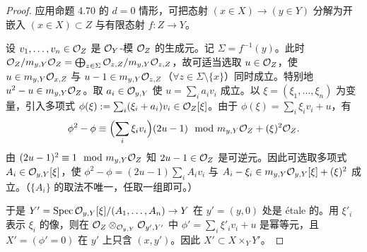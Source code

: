 \begin{proof}
应用命题 4.70 的 $d=0$ 情形，可把态射 $(x\in X)\to(y\in Y)$ 分解为开嵌入 $(x\in X)\subset Z$ 与有限态射 $f:Z\to Y$。

设 $v_1,\dots,v_n\in\mathcal{O}_Z$ 是 $\mathcal{O}_Y$-模 $\mathcal{O}_Z$ 的生成元。记 $\Sigma=f^{-1}(y)$。此时 $\mathcal{O}_Z/m_{y,Y}\mathcal{O}_Z=\bigoplus_{z\in\Sigma}\mathcal{O}_{z,Z}/m_{y,Y}\mathcal{O}_{z,Z}$，故可适当选取 $u\in\mathcal{O}_Z$，使 $u\in m_{y,Y}\mathcal{O}_{x,Z}$ 与 $u-1\in m_{y,Y}\mathcal{O}_{z,Z}$（$\forall z\in\Sigma\setminus\{x\}$）同时成立。特别地 $u^2-u\in m_{y,Y}\mathcal{O}_Z$。取 $a_i\in\mathcal{O}_{y,Y}$ 使 $u=\sum_ia_iv_i$ 成立。以 $\xi=(\xi_1,\dots,\xi_n)$ 为变量，引入多项式 $\phi(\xi):=\sum_i(\xi_i+a_i)v_i\in\mathcal{O}_Z[\xi]$。由于 $\phi(\xi)=\sum_i\xi_iv_i+u$，有
\[ \phi^2-\phi\equiv\Bigl(\sum_i\xi_iv_i\Bigr)(2u-1)\mod m_{y,Y}\mathcal{O}_Z+(\xi)^2\mathcal{O}_Z. \]
由 $(2u-1)^2\equiv1\mod m_{y,Y}\mathcal{O}_Z$ 知 $2u-1\in\mathcal{O}_Z$ 是可逆元。因此可选取多项式 $A_i\in\mathcal{O}_{y,Y}[\xi]$，使 $\phi^2-\phi=(2u-1)\sum_iA_iv_i$ 与 $A_i-\xi_i\in m_{y,Y}\mathcal{O}_{y,Y}[\xi]+(\xi)^2$ 成立。（$\{A_i\}$ 的取法不唯一，任取一组即可。）

于是 $Y'=\operatorname{Spec}\mathcal{O}_{y,Y}[\xi]/(A_1,\dots,A_n)\to Y$ 在 $y'=(y,0)$ 处是 étale 的。用 $\xi'_i$ 表示 $\xi_i$ 的像，则在 $\mathcal{O}_Z\otimes_{\mathcal{O}_{y,Y}}\mathcal{O}_{y',Y'}$ 中 $\phi'=\sum_i\xi'_iv_i+u$ 是幂等元，且 $X'=(\phi'=0)$ 在 $y'$ 上只含 $(x,y')$。因此 $X'\subset X\times_YY'$。
\end{proof}

